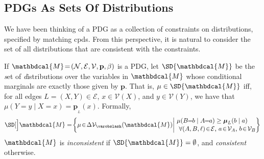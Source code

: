 \documentclass[letterpaper]{article} %
\theoremstyle{plain}
\theoremstyle{definition}
\theoremstyle{remark}
\newcommand\mat[1]{\mathbf{#1}}
\newcommand{\notation}[2][]{#1}
\renewcommand{\notation}[2][]{{\color{notationcolor} #2}}
\newcommand{\none}{\varobslash}
\def\sheq{\!=\!}
\newcommand{\bp}[1][L]{\mat{p}_{\!_{#1}\!}}
\newcommand{\V}{\mathcal V}
\newcommand{\N}{\mathcal N}
\newcommand{\Ed}{\mathcal E}
\newcommand{\pdgvars}[1][]{(\N#1, \Ed#1, \V#1, \mat p#1, \beta#1)}
\newcommand{\dg}[1]{\mathbdcal{#1}}
\begin{document}
\subsection{PDGs As Sets Of Distributions}\label{sec:set-of-distribution-semantics} 
We have been thinking of a PDG as a collection of constraints on distributions, specified by matching cpds. From this perspective, 
it is natural to consider
the set of all distributions that are consistent with the constraints.

\begin{defn} \label{def:set-semantics} 
If $\dg M\sheq\pdgvars[]$ is a PDG, let $\SD{\dg M}$ be the \emph{s}et of \emph{d}istributions over the variables in $\dg M$ 
whose conditional marginals are exactly those given by $\mat p$.
That is, $\mu \in \SD{\dg M}$ iff, for all edges $L = (X,Y) \in \Ed$,  $x \in \V(X)$,  and $y \in \V(Y)$, we have that $\mu(Y = y \mid X\sheq x) = \bp(x)$.
\notation{Formally,		
        \[ \SD[\Big]\dg M = \!\left\{\mu \!\in\! \Delta \V_\none (\dg M) \middle|\!
        \begin{array}{l}
        \mu(B\!\! =\!\!b \mid A\!\!=\!\!a) \geq \boldsymbol\mu_L(b \mid a) \\[0.1em]
        ~\text{$\forall (A, B,\ell) \!\in\! \Ed$, $a \!\in\!\mathcal V_A$, $b \!\in\! \mathcal V_B$} \end{array}\!\!\! \right\}\]
    }
$\dg M$ is \emph{inconsistent} if $\SD{\dg M} = \emptyset$, and \emph{consistent} otherwise.
\end{defn}
\end{document}
